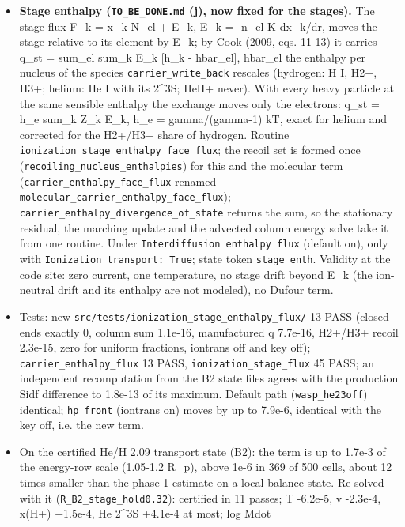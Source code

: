 \documentclass[english,a4paper]{my_memo}
\providecommand{\tightlist}{\setlength{\itemsep}{0pt}\setlength{\parskip}{0pt}}
\begin{document}
\begin{itemize}
\tightlist
\item
  \textbf{Stage enthalpy (\texttt{TO\_BE\_DONE.md} (j), now fixed for the stages).} The
  stage flux F\_k = x\_k N\_el + E\_k, E\_k = -n\_el K dx\_k/dr, moves the stage
  relative to its element by E\_k; by Cook (2009, eqs. 11-13) it carries
  q\_st = sum\_el sum\_k E\_k {[}h\_k - hbar\_el{]}, hbar\_el the enthalpy per nucleus
  of the species \texttt{carrier\_write\_back} rescales (hydrogen: H I, H2+, H3+;
  helium: He I with its 2\^{}3S; HeH+ never). With every heavy particle at
  the same sensible enthalpy the exchange moves only the electrons\textquotesingle:
  q\_st = h\_e sum\_k Z\_k E\_k, h\_e = gamma/(gamma-1) kT, exact for helium and
  corrected for the H2+/H3+ share of hydrogen. Routine
  \texttt{ionization\_stage\_enthalpy\_face\_flux}; the recoil set is formed once
  (\texttt{recoiling\_nucleus\_enthalpies}) for this and the molecular term
  (\texttt{carrier\_enthalpy\_face\_flux} renamed \texttt{molecular\_carrier\_enthalpy\_face\_flux});
  \texttt{carrier\_enthalpy\_divergence\_of\_state} returns the sum, so the stationary
  residual, the marching update and the advected column energy solve take
  it from one routine. Under \texttt{Interdiffusion\ enthalpy\ flux} (default on),
  only with \texttt{Ionization\ transport:\ True}; state token \texttt{stage\_enth}. Validity
  at the code site: zero current, one temperature, no stage drift beyond
  E\_k (the ion-neutral drift and its enthalpy are not modeled), no Dufour
  term.
\item
  Tests: new \texttt{src/tests/ionization\_stage\_enthalpy\_flux/} 13 PASS (closed
  ends exactly 0, column sum 1.1e-16, manufactured q 7.7e-16, H2+/H3+
  recoil 2.3e-15, zero for uniform fractions, iontrans off and key off);
  \texttt{carrier\_enthalpy\_flux} 13 PASS, \texttt{ionization\_stage\_flux} 45 PASS; an
  independent recomputation from the B2 state files agrees with the
  production Sidf difference to 1.8e-13 of its maximum. Default path
  (\texttt{wasp\_he23off}) identical; \texttt{hp\_front} (iontrans on) moves by up to
  7.9e-6, identical with the key off, i.e. the new term.
\item
  On the certified He/H 2.09 transport state (B2): the term is up to
  1.7e-3 of the energy-row scale (1.05-1.2 R\_p), above 1e-6 in 369 of 500
  cells, about 12 times smaller than the phase-1 estimate on a local-balance
  state. Re-solved with it (\texttt{R\_B2\_stage\_hold0.32}): certified in 11 passes;
  T -6.2e-5, v -2.3e-4, x(H+) +1.5e-4, He 2\^{}3S +4.1e-4 at most; log Mdot

\end{itemize}
\end{document}
